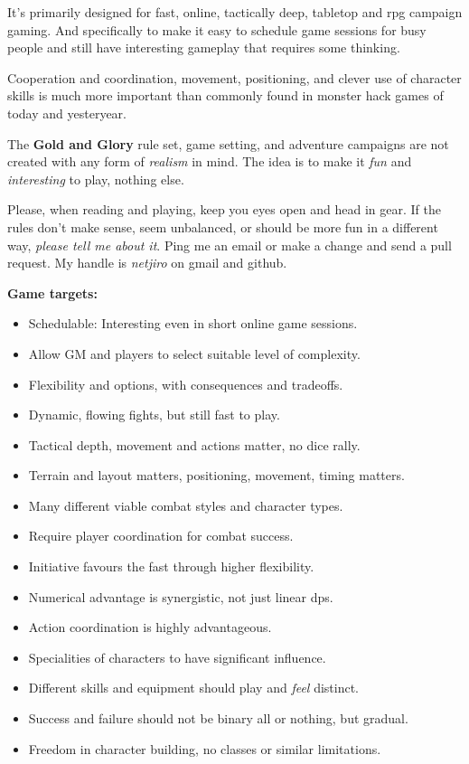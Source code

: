 It's primarily designed for fast, online, tactically deep, tabletop and rpg campaign gaming. And specifically to make it easy to schedule game sessions for busy people and still have interesting gameplay that requires some thinking.

Cooperation and coordination, movement, positioning, and clever use of character skills is much more important than commonly found in monster hack games of today and yesteryear.

The \textbf{Gold and Glory} rule set, game setting, and adventure campaigns are not created with any form of \emph{realism} in mind. The idea is to make it \emph{fun} and \emph{interesting} to play, nothing else.

Please, when reading and playing, keep you eyes open and head in gear. If the rules don't make sense, seem unbalanced, or should be more fun in a different way, \emph{please tell me about it}. Ping me an email or make a change and send a pull request. My handle is \emph{netjiro} on gmail and github.



\cleartoleftpage
\textbf{Game targets:}
\begin{itemize}
    \item Schedulable: Interesting even in short online game sessions.
    \item Allow GM and players to select suitable level of complexity.
    \item Flexibility and options, with consequences and tradeoffs.
    \item Dynamic, flowing fights, but still fast to play.
    \item Tactical depth, movement and actions matter, no dice rally.
    \item Terrain and layout matters, positioning, movement, timing matters.
    \item Many different viable combat styles and character types.
    \item Require player coordination for combat success.
    \item Initiative favours the fast through higher flexibility.
    \item Numerical advantage is synergistic, not just linear dps.
    \item Action coordination is highly advantageous.
    \item Specialities of characters to have significant influence.
    \item Different skills and equipment should play and \emph{feel} distinct.
    \item Success and failure should not be binary all or nothing, but gradual.
    \item Freedom in character building, no classes or similar limitations.
\end{itemize}

